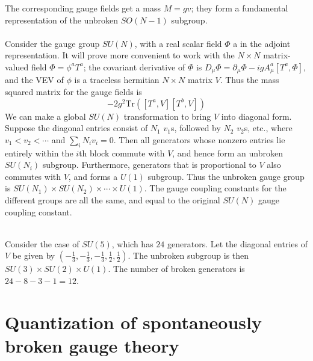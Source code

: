 The corresponding gauge fields get a mass $M = gv$; they form a fundamental representation of the unbroken $SO(N-1)$ subgroup.
\\ \\
Consider the gauge group $SU(N)$, with a real scalar field $\Phi$ a in the adjoint representation. It will prove more convenient to work with the $N \times N$ matrix-valued field $\Phi = \phi^a T^a$; the covariant derivative of $\Phi$ is $D_{\mu}\Phi = \partial_{\mu}\Phi - igA^a_{\mu}[T^a,\Phi]$,
and the VEV of $\phi$ is a traceless hermitian $N \times N$ matrix $V$. Thus the mass squared matrix for the gauge fields is
\[-2g^2 \mathrm{Tr}\left([T^a,V][T^b,V]\right)\]
We can make a global $SU(N)$ transformation to bring $V$ into diagonal form. Suppose the diagonal entries consist of $N_1$ $v_1$s, followed by $N_2$ $v_2$s, etc.,
where $v_1 < v_2 < \cdots$ and $\sum_i N_i v_i = 0$. 
Then all generators whose nonzero entries lie entirely within the $i$th block commute with $V$, and hence form an
unbroken $SU(N_i)$ subgroup. Furthermore, generators that is proportional to $V$ also commutes with $V$, and forms a
$U(1)$ subgroup. Thus the unbroken gauge group is $SU(N_1)\times SU(N_2) \times \cdots \times U(1)$. The gauge coupling constants for the different groups are all the same, and equal to the original $SU(N)$ gauge coupling constant.
\\ \\
\begin{example}
Consider the case of $SU(5)$, which has $24$ generators. Let the diagonal entries of $V$ be given by $(-\frac{1}{3},-\frac{1}{3},-\frac{1}{3}, \frac{1}{2}, \frac{1}{2})$. The unbroken subgroup is then $SU(3) \times SU(2) \times U(1)$. The number of broken generators is $24 - 8 - 3 - 1 = 12$.
\end{example}

\section{Quantization of spontaneously broken gauge theory}
